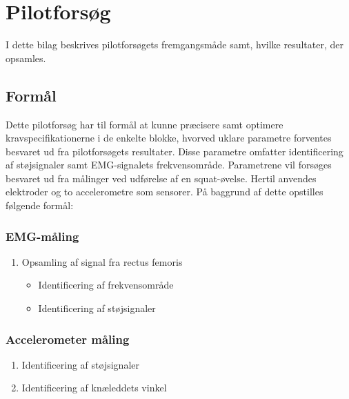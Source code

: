 \chapter{Pilotforsøg} \label{sec:pilotforsoeg}
I dette bilag beskrives pilotforsøgets fremgangsmåde samt, hvilke resultater, der opsamles. 

\section{Formål}
Dette pilotforsøg har til formål at kunne præcisere samt optimere kravspecifikationerne i de enkelte blokke, hvorved uklare parametre forventes besvaret ud fra pilotforsøgets resultater. Disse parametre omfatter identificering af støjsignaler samt EMG-signalets frekvensområde. Parametrene vil forsøges besvaret ud fra målinger ved udførelse af en squat-øvelse.
Hertil anvendes elektroder og to accelerometre som sensorer. På baggrund af dette opstilles følgende formål:  

\subsection{EMG-måling}
\begin{enumerate}
\item Opsamling af signal fra rectus femoris %
	\begin{itemize}
	\item Identificering af frekvensområde
	\item Identificering af støjsignaler 
	\end{itemize}
\end{enumerate}

\subsection{Accelerometer måling}
\begin{enumerate}
\item Identificering af støjsignaler 
\item Identificering af knæleddets vinkel
\end{enumerate}

